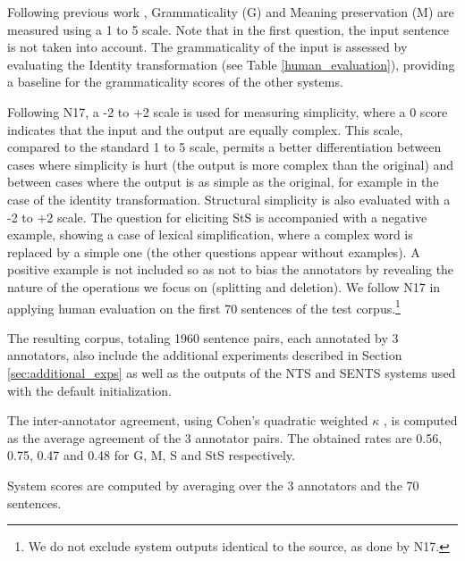 \documentclass[11pt,a4paper]{article}
\begin{document}
Following previous work \citep[e.g.,][]{NG14,Xu16,Ni17}, Grammaticality (G) and Meaning preservation (M) are measured using a 1 to 5 scale. 
Note that in the first question, the input sentence is not taken into account. The grammaticality of the input is assessed by 
evaluating the Identity transformation (see Table \ref{human_evaluation}), providing a baseline for the grammaticality scores of the other systems.

Following N17, a -2 to +2 scale is used for measuring simplicity, where a 0 score indicates that the input and the output are equally complex. This scale, compared to the standard 1 to 5 scale, permits a better differentiation between cases where simplicity is hurt (the output is more complex than the original) and between cases where the output is as simple as the original, for example in the case of the identity transformation.
Structural simplicity is also evaluated with a -2 to +2 scale. 
The question for eliciting StS is accompanied with a negative example, showing a case of lexical simplification, where a complex word 
is replaced by a simple one (the other questions appear without examples). 
A positive example is not included so as not to bias the annotators by revealing the nature of the operations we focus on
(splitting and deletion). 
We follow N17 in applying human evaluation on the first 70 sentences of the test corpus.\footnote{We do not exclude system outputs identical to the source, as done by N17.}

The resulting corpus, totaling 1960 sentence pairs, each annotated by 3 annotators, also include the additional experiments described in Section \ref{sec:additional_exps} as well as the outputs of the NTS and SENTS systems used with the default initialization.

The inter-annotator agreement, using Cohen's quadratic weighted $\kappa$ \citep{C68}, is computed as the average agreement of the 3 annotator pairs.
The obtained rates are 0.56, 0.75, 0.47 and 0.48 for G, M, S and StS respectively.

System scores are computed by averaging over the 3 annotators and the 70 sentences.
\end{document}
